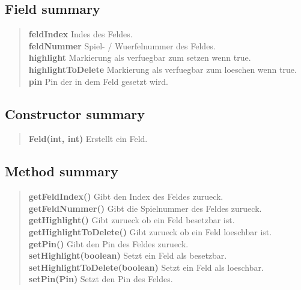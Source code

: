 \documentclass[11pt,a4paper]{report}
\begin{document}
{{{{{{{\subsection{Field summary}{
\begin{verse}
{\bf feldIndex} Indes des Feldes.\\
{\bf feldNummer} Spiel- / Wuerfelnummer des Feldes.\\
{\bf highlight} Markierung als verfuegbar zum setzen wenn true.\\
{\bf highlightToDelete} Markierung als verfuegbar zum loeschen wenn true.\\
{\bf pin} Pin der in dem Feld gesetzt wird.\\
\end{verse}
}
\subsection{Constructor summary}{
\begin{verse}
{\bf Feld(int, int)} Erstellt ein Feld.\\
\end{verse}
}
\subsection{Method summary}{
\begin{verse}
{\bf getFeldIndex()} Gibt den Index des Feldes zurueck.\\
{\bf getFeldNummer()} Gibt die Spielnummer des Feldes zurueck.\\
{\bf getHighlight()} Gibt zurueck ob ein Feld besetzbar ist.\\
{\bf getHighlightToDelete()} Gibt zurueck ob ein Feld loeschbar ist.\\
{\bf getPin()} Gibt den Pin des Feldes zurueck.\\
{\bf setHighlight(boolean)} Setzt ein Feld als besetzbar.\\
{\bf setHighlightToDelete(boolean)} Setzt ein Feld als loeschbar.\\
{\bf setPin(Pin)} Setzt den Pin des Feldes.\\
\end{verse}
}
}}}}}}}
\end{document}
